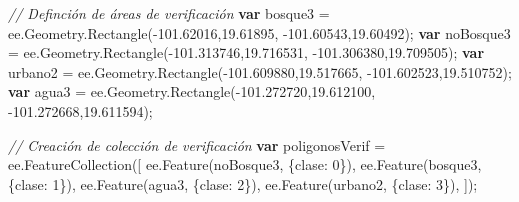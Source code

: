 \documentclass[
  12pt,
  letterpaper,
  twoside]{book}
\newenvironment{Shaded}{\begin{snugshade}}{\end{snugshade}}
\newcommand{\AttributeTok}[1]{\textcolor[rgb]{0.48,0.12,0.64}{#1}}
\newcommand{\CommentTok}[1]{\textcolor[rgb]{0.24,0.58,0.00}{\textit{#1}}}
\newcommand{\ControlFlowTok}[1]{\textcolor[rgb]{0.00,0.00,0.00}{\textbf{#1}}}
\newcommand{\DecValTok}[1]{\textcolor[rgb]{0.28,0.53,0.93}{#1}}
\newcommand{\FloatTok}[1]{\textcolor[rgb]{0.28,0.53,0.93}{#1}}
\newcommand{\FunctionTok}[1]{\textcolor[rgb]{0.48,0.12,0.64}{#1}}
\newcommand{\KeywordTok}[1]{\textcolor[rgb]{0.48,0.12,0.64}{#1}}
\newcommand{\NormalTok}[1]{#1}
\newcommand{\OperatorTok}[1]{\textcolor[rgb]{0.00,0.00,0.00}{#1}}
\newcommand{\StringTok}[1]{\textcolor[rgb]{0.87,0.29,0.22}{#1}}
\begin{document}
\begin{Shaded}
\begin{Highlighting}[]
\CommentTok{// Definción de áreas de verificación}
\ControlFlowTok{var}\NormalTok{ bosque3 }\OperatorTok{=} \KeywordTok{ee}\OperatorTok{.}\AttributeTok{Geometry}\OperatorTok{.}\FunctionTok{Rectangle}\NormalTok{(}\OperatorTok{{-}}\FloatTok{101.62016}\OperatorTok{,}\FloatTok{19.61895}\OperatorTok{,} 
  \OperatorTok{{-}}\FloatTok{101.60543}\OperatorTok{,}\FloatTok{19.60492}\NormalTok{)}\OperatorTok{;}
\ControlFlowTok{var}\NormalTok{ noBosque3 }\OperatorTok{=} \KeywordTok{ee}\OperatorTok{.}\AttributeTok{Geometry}\OperatorTok{.}\FunctionTok{Rectangle}\NormalTok{(}\OperatorTok{{-}}\FloatTok{101.313746}\OperatorTok{,}\FloatTok{19.716531}\OperatorTok{,} 
  \OperatorTok{{-}}\FloatTok{101.306380}\OperatorTok{,}\FloatTok{19.709505}\NormalTok{)}\OperatorTok{;}
\ControlFlowTok{var}\NormalTok{ urbano2 }\OperatorTok{=} \KeywordTok{ee}\OperatorTok{.}\AttributeTok{Geometry}\OperatorTok{.}\FunctionTok{Rectangle}\NormalTok{(}\OperatorTok{{-}}\FloatTok{101.609880}\OperatorTok{,}\FloatTok{19.517665}\OperatorTok{,} 
  \OperatorTok{{-}}\FloatTok{101.602523}\OperatorTok{,}\FloatTok{19.510752}\NormalTok{)}\OperatorTok{;}
\ControlFlowTok{var}\NormalTok{ agua3 }\OperatorTok{=} \KeywordTok{ee}\OperatorTok{.}\AttributeTok{Geometry}\OperatorTok{.}\FunctionTok{Rectangle}\NormalTok{(}\OperatorTok{{-}}\FloatTok{101.272720}\OperatorTok{,}\FloatTok{19.612100}\OperatorTok{,} 
  \OperatorTok{{-}}\FloatTok{101.272668}\OperatorTok{,}\FloatTok{19.611594}\NormalTok{)}\OperatorTok{;}

\CommentTok{// Creación de colección de verificación}
\ControlFlowTok{var}\NormalTok{ poligonosVerif }\OperatorTok{=} \KeywordTok{ee}\OperatorTok{.}\FunctionTok{FeatureCollection}\NormalTok{([}
  \KeywordTok{ee}\OperatorTok{.}\FunctionTok{Feature}\NormalTok{(noBosque3}\OperatorTok{,}\NormalTok{ \{}\StringTok{\textquotesingle{}clase\textquotesingle{}}\OperatorTok{:} \DecValTok{0}\NormalTok{\})}\OperatorTok{,}
  \KeywordTok{ee}\OperatorTok{.}\FunctionTok{Feature}\NormalTok{(bosque3}\OperatorTok{,}\NormalTok{ \{}\StringTok{\textquotesingle{}clase\textquotesingle{}}\OperatorTok{:} \DecValTok{1}\NormalTok{\})}\OperatorTok{,}
  \KeywordTok{ee}\OperatorTok{.}\FunctionTok{Feature}\NormalTok{(agua3}\OperatorTok{,}\NormalTok{ \{}\StringTok{\textquotesingle{}clase\textquotesingle{}}\OperatorTok{:} \DecValTok{2}\NormalTok{\})}\OperatorTok{,}
  \KeywordTok{ee}\OperatorTok{.}\FunctionTok{Feature}\NormalTok{(urbano2}\OperatorTok{,}\NormalTok{ \{}\StringTok{\textquotesingle{}clase\textquotesingle{}}\OperatorTok{:} \DecValTok{3}\NormalTok{\})}\OperatorTok{,}
\NormalTok{])}\OperatorTok{;}
\end{Highlighting}
\end{Shaded}
\end{document}
